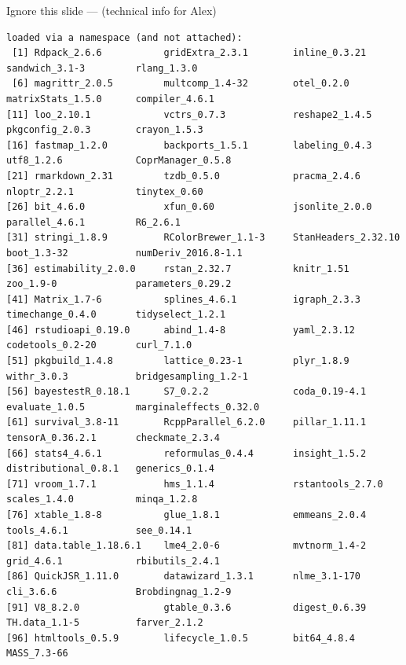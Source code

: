 \documentclass[
  10pt,
  ignorenonframetext,
  aspectratio=169,
  t]{beamer}
\begin{document}
\begin{frame}[fragile]{Ignore this slide --- (technical info for Alex)}
\begin{verbatim}
loaded via a namespace (and not attached):
 [1] Rdpack_2.6.6           gridExtra_2.3.1        inline_0.3.21          sandwich_3.1-3         rlang_1.3.0           
 [6] magrittr_2.0.5         multcomp_1.4-32        otel_0.2.0             matrixStats_1.5.0      compiler_4.6.1        
[11] loo_2.10.1             vctrs_0.7.3            reshape2_1.4.5         pkgconfig_2.0.3        crayon_1.5.3          
[16] fastmap_1.2.0          backports_1.5.1        labeling_0.4.3         utf8_1.2.6             CoprManager_0.5.8     
[21] rmarkdown_2.31         tzdb_0.5.0             pracma_2.4.6           nloptr_2.2.1           tinytex_0.60          
[26] bit_4.6.0              xfun_0.60              jsonlite_2.0.0         parallel_4.6.1         R6_2.6.1              
[31] stringi_1.8.9          RColorBrewer_1.1-3     StanHeaders_2.32.10    boot_1.3-32            numDeriv_2016.8-1.1   
[36] estimability_2.0.0     rstan_2.32.7           knitr_1.51             zoo_1.9-0              parameters_0.29.2     
[41] Matrix_1.7-6           splines_4.6.1          igraph_2.3.3           timechange_0.4.0       tidyselect_1.2.1      
[46] rstudioapi_0.19.0      abind_1.4-8            yaml_2.3.12            codetools_0.2-20       curl_7.1.0            
[51] pkgbuild_1.4.8         lattice_0.23-1         plyr_1.8.9             withr_3.0.3            bridgesampling_1.2-1  
[56] bayestestR_0.18.1      S7_0.2.2               coda_0.19-4.1          evaluate_1.0.5         marginaleffects_0.32.0
[61] survival_3.8-11        RcppParallel_6.2.0     pillar_1.11.1          tensorA_0.36.2.1       checkmate_2.3.4       
[66] stats4_4.6.1           reformulas_0.4.4       insight_1.5.2          distributional_0.8.1   generics_0.1.4        
[71] vroom_1.7.1            hms_1.1.4              rstantools_2.7.0       scales_1.4.0           minqa_1.2.8           
[76] xtable_1.8-8           glue_1.8.1             emmeans_2.0.4          tools_4.6.1            see_0.14.1            
[81] data.table_1.18.6.1    lme4_2.0-6             mvtnorm_1.4-2          grid_4.6.1             rbibutils_2.4.1       
[86] QuickJSR_1.11.0        datawizard_1.3.1       nlme_3.1-170           cli_3.6.6              Brobdingnag_1.2-9     
[91] V8_8.2.0               gtable_0.3.6           digest_0.6.39          TH.data_1.1-5          farver_2.1.2          
[96] htmltools_0.5.9        lifecycle_1.0.5        bit64_4.8.4            MASS_7.3-66           
\end{verbatim}

\normalsize
\end{frame}
\end{document}
